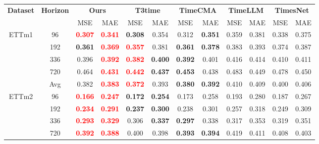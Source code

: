 \begin{table}[!htbp]
\centering
\small
\setlength{\tabcolsep}{3.6pt}
\renewcommand{\arraystretch}{0.96}
\label{tab:chap5-main-results-a}
\begin{tabular}{c|c|cc|cc|cc|cc|cc}
\toprule
\multirow{2}{*}{\textbf{Dataset}} & \multirow{2}{*}{\textbf{Horizon}} &
\multicolumn{2}{c|}{\textbf{Ours}} &
\multicolumn{2}{c|}{\textbf{T3time}} &
\multicolumn{2}{c|}{\textbf{TimeCMA}} &
\multicolumn{2}{c|}{\textbf{TimeLLM}} &
\multicolumn{2}{c}{\textbf{TimesNet}} \\
& & MSE & MAE & MSE & MAE & MSE & MAE & MSE & MAE & MSE & MAE \\
\midrule
\multirow{5}{*}{ETTm1}
& 96 & \textbf{\textcolor{red}{0.307}} & \textbf{\textcolor{red}{0.341}} & \textbf{0.308} & 0.354 & 0.312 & \textbf{0.351} & 0.359 & 0.381 & 0.338 & 0.375 \\
& 192 & \textbf{0.361} & \textbf{\textcolor{red}{0.369}} & \textbf{\textcolor{red}{0.357}} & 0.381 & \textbf{0.361} & \textbf{0.378} & 0.383 & 0.393 & 0.374 & 0.387 \\
& 336 & 0.396 & \textbf{\textcolor{red}{0.392}} & \textbf{\textcolor{red}{0.382}} & \textbf{0.400} & \textbf{0.392} & 0.401 & 0.416 & 0.414 & 0.410 & 0.411 \\
& 720 & 0.464 & \textbf{\textcolor{red}{0.431}} & \textbf{\textcolor{red}{0.442}} & \textbf{0.437} & \textbf{0.453} & 0.438 & 0.483 & 0.449 & 0.478 & 0.450 \\
& Avg & 0.382 & \textbf{\textcolor{red}{0.383}} & \textbf{\textcolor{red}{0.372}} & 0.393 & \textbf{0.380} & \textbf{0.392} & 0.410 & 0.409 & 0.400 & 0.406 \\
\midrule
\multirow{5}{*}{ETTm2}
& 96 & \textbf{\textcolor{red}{0.166}} & \textbf{\textcolor{red}{0.247}} & \textbf{0.172} & \textbf{0.254} & 0.173 & 0.258 & 0.193 & 0.280 & 0.187 & 0.267 \\
& 192 & \textbf{\textcolor{red}{0.234}} & \textbf{\textcolor{red}{0.291}} & \textbf{0.237} & \textbf{0.300} & 0.238 & 0.301 & 0.257 & 0.318 & 0.249 & 0.309 \\
& 336 & \textbf{\textcolor{red}{0.293}} & \textbf{\textcolor{red}{0.329}} & 0.306 & \textbf{0.337} & \textbf{0.297} & 0.338 & 0.317 & 0.353 & 0.319 & 0.351 \\
& 720 & \textbf{\textcolor{red}{0.392}} & \textbf{\textcolor{red}{0.388}} & 0.400 & 0.398 & \textbf{0.393} & \textbf{0.394} & 0.419 & 0.411 & 0.408 & 0.403 \\

\end{tabular}
\end{table}
